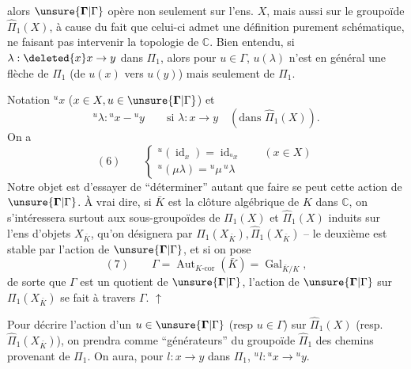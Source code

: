 alors $\unsure{\mathbf{\Gamma}|\Gamma}$ opère non seulement sur  l'ens. $X$, mais aussi sur le groupoïde $\widehat\Pi_1(X)$, à cause du fait que celui-ci admet une définition purement schématique, ne faisant pas intervenir la topologie de $\mathbb C$. Bien entendu, si $\lambda:\deleted{x} x\to y$ dans $\Pi_1$, alors pour $u\in\Gamma$, $u(\lambda)$ n'est  en général une flèche de $\Pi_1$ (de $u(x)$ vers $u(y)$) mais seulement de $\widehat\Pi_1$.

 Notation ${}^ux$ ($x\in X,u\in\unsure{\mathbf{\Gamma}|\Gamma}$) et 
\[
{}^u\lambda:{}^ux-{}^uy\qquad\text{si }\lambda:x\to y\quad(\text{dans }\widehat\Pi_1(X)).
\]
On a
\[
(6)\qquad\begin{cases}
{}^u(\operatorname{id}_x)=\operatorname{id}_{{}^ux}\qquad(x\in X)\\
{}^u(\mu\lambda)={}^u\mu\,{}^u\lambda
\end{cases}
\]
Notre objet est d'essayer de ``déterminer'' autant que faire se peut cette action de $\unsure{\mathbf{\Gamma}|\Gamma}$. À vrai dire, si $\bar K$ est la clôture algébrique de $K$ dans $\mathbb C$, on s'intéressera surtout aux sous-groupoïdes de $\Pi_1(X)$ et $\widehat\Pi_1(X)$ induits sur l'ens d'objets $X_{\bar K}$, qu'on désignera par $\Pi_1(X_{\bar K}),\widehat\Pi_1(X_{\bar K})$ -- le deuxième est stable par l'action de $\unsure{\mathbf{\Gamma}|\Gamma}$, et si on pose
\[
(7)\qquad\Gamma=\operatorname{Aut}_{K\text{-cor}}(\bar K)=\operatorname{Gal}_{\bar K/K},
\]
de sorte que $\Gamma$ est un quotient de $\unsure{\mathbf{\Gamma}|\Gamma}$, l'action de $\unsure{\mathbf{\Gamma}|\Gamma}$ sur $\Pi_1(X_{\bar K})$ se fait à travers $\Gamma$. $\uparrow$

Pour décrire l'action d'un $u\in\unsure{\mathbf{\Gamma}|\Gamma}$ (resp $u\in\Gamma$) sur $\widehat\Pi_1(X)$ (resp. $\widehat\Pi_1(X_{\bar K})$), on prendra comme ``générateurs'' du groupoïde $\widehat\Pi_1$ des chemins provenant de $\Pi_1$. On aura, pour ${l}:x\to y$ dans $\Pi_1$, ${}^u{l}:{}^ux\to{}^uy$.

